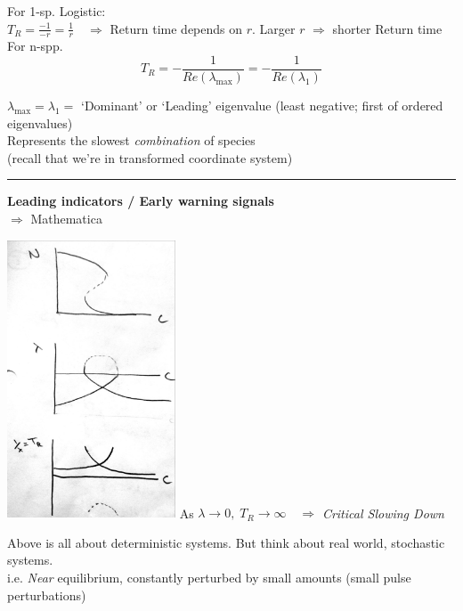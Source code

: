 \documentclass{article}
\newcommand{\note}[1]{\colorbox{gray!30}{#1}}
\newcommand{\ind}{\-\hspace{1cm}}
\begin{document}
\pagebreak

For 1-sp. Logistic:\\
\ind $T_R=\frac{-1}{-r}=\frac{1}{r} \quad \Rightarrow$ Return time depends on $r$.  Larger $r$ $\Rightarrow$ shorter Return time\\

For n-spp.\\
\begin{equation*}
T_R=-\frac{1}{Re(\lambda_\text{max})} = -\frac{1}{Re(\lambda_1)}
\end{equation*}

\ind $\lambda_{\text{max}} = \lambda_1 = $ `Dominant' or `Leading' eigenvalue (least negative; first of ordered eigenvalues)\\
\ind \ind Represents the slowest \emph{combination} of species\\
\ind \ind \ind (recall that we're in transformed coordinate system)

\rule[0.5ex]{\linewidth}{1pt}

\textbf{Leading indicators / Early warning signals}\\
\note{$\Rightarrow$ Mathematica}
\begin{center}
 	\includegraphics[width=5cm]{figs/Exploitation_CriticalSlowingDown.pdf}
 	As $\lambda \to 0, \; T_R \to \infty \quad \Rightarrow$ \emph{Critical Slowing Down}
\end{center}

Above is all about deterministic systems.  But think about real world, stochastic systems.\\
\ind i.e. \emph{Near} equilibrium,  constantly perturbed by small amounts (small pulse perturbations)\\
\end{document}
